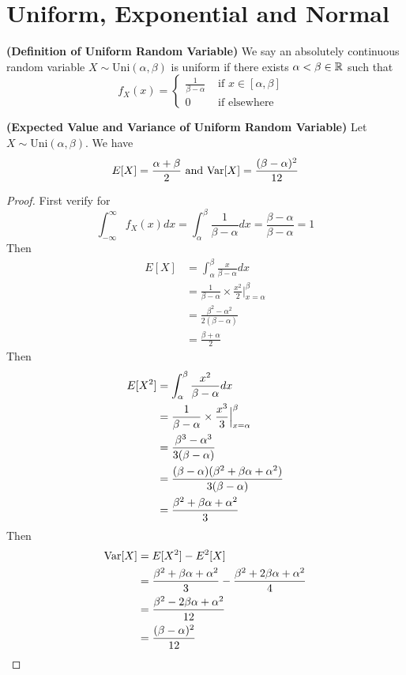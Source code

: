 \documentclass{report}
\begin{document}
\section{Uniform, Exponential and Normal}
\begin{definition}
\label{2.3.1}
\textbf{(Definition of Uniform Random Variable)} We say an absolutely continuous random variable $X\sim \text{Uni}(\alpha ,\beta )$ is uniform if there exists $\alpha <\beta \in\mathbb{R}$ such that
\begin{equation}
f_X(x)=\begin{cases}
\frac{1}{\beta -\alpha }& \text{ if $x\in [\alpha ,\beta ]$ }\\
0& \text{ if elsewhere }
\end{cases}
\end{equation}
\end{definition}
\begin{theorem}
\label{2.3.2}
\textbf{(Expected Value and Variance of Uniform Random Variable)} Let $X\sim \text{Uni}(\alpha ,\beta )$. We have
\begin{equation}
E[X]=\frac{\alpha +\beta }{2}\text{ and }\text{Var} [X]=\frac{(\beta -\alpha )^2}{12}
\end{equation}
\end{theorem}
\begin{proof}
First verify for
\begin{equation}
\int_{-\infty}^\infty f_X(x)dx=\int_{\alpha }^\beta \frac{1}{\beta -\alpha }dx=\frac{\beta -\alpha }{\beta -\alpha }=1
\end{equation}
Then 
\begin{align}
E[X]&=\int_{\alpha }^\beta \frac{x}{\beta -\alpha }dx\\
&=\frac{1}{\beta -\alpha }\times \frac{x^2}{2} \Big|_{x=\alpha }^\beta \\
&=\frac{\beta ^2-\alpha ^2}{2(\beta -\alpha )}\\
&=\frac{\beta +\alpha }{2}
\end{align}
Then 
\begin{align}
E[X^2]&=\int_{\alpha }^\beta \frac{x^2}{\beta -\alpha }dx\\
      &=\frac{1}{\beta -\alpha }\times \frac{x^3}{3} \Big |_{x=\alpha }^\beta\\
      &=\frac{\beta ^3-\alpha ^3}{3(\beta -\alpha )}\\
      &=\frac{(\beta -\alpha )(\beta ^2+\beta \alpha +\alpha ^2)}{3(\beta -\alpha )}\\
      &=\frac{\beta ^2+\beta \alpha +\alpha ^2}{3}
\end{align}
Then
\begin{align}
\text{Var} [X]&=E[X^2]-E^2[X]\\
&=\frac{\beta ^2+\beta \alpha +\alpha ^2}{3}-\frac{\beta ^2+2\beta \alpha +\alpha ^2}{4}\\
&=\frac{\beta^2-2\beta \alpha +\alpha ^2}{12}\\
&=\frac{(\beta -\alpha )^2}{12}
\end{align}
\end{proof}
\end{document}

